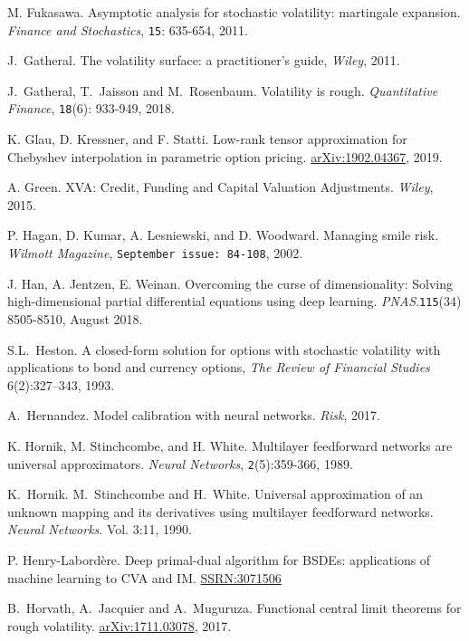 \documentclass{article}
\theoremstyle{remark}
\begin{document}
\begin{thebibliography}{99}
M. Fukasawa.
Asymptotic analysis for stochastic volatility: martingale expansion.
\textit{Finance and Stochastics}, {\tt 15}: 635-654, 2011.

 J.~Gatheral. The volatility surface: a practitioner's guide,
\textit{Wiley}, 2011.

J.~Gatheral, T.~Jaisson  and M.~Rosenbaum.
Volatility is rough.
\textit{Quantitative Finance}, {\tt 18}(6): 933-949, 2018.

K. Glau, D. Kressner, and F. Statti.
Low-rank tensor approximation for Chebyshev interpolation in parametric option pricing.
\href{https://arxiv.org/pdf/1902.04367.pdf}{arXiv:1902.04367}, 2019.

A. Green. XVA: Credit, Funding and Capital Valuation Adjustments. \textit{Wiley}, 2015.

P. Hagan, D. Kumar, A. Lesniewski, and D. Woodward. Managing smile risk. \textit{Wilmott Magazine}, {\tt September issue: 84-108}, 2002.

J. Han, A. Jentzen, E. Weinan.
Overcoming the curse of dimensionality: Solving high-dimensional partial differential equations using deep learning.
\textit{PNAS}.{\tt 115}(34) 8505-8510, August 2018.

S.L.~Heston. A closed-form solution for options with stochastic
  volatility with applications to bond and currency options, \textit{The Review of Financial Studies} 6(2):327--343, 1993.

A.~Hernandez. Model calibration with neural networks. \textit{Risk}, 2017.    

K. Hornik, M. Stinchcombe, and H. White. 
Multilayer feedforward networks are universal approximators. 
\textit{Neural Networks}, {\tt 2}(5):359-366, 1989.

K.~Hornik. M.~Stinchcombe and H.~White. Universal approximation of an unknown mapping and its derivatives using multilayer feedforward networks. \textit{Neural Networks}.
Vol. 3:11, 1990.

P. Henry-Labord\`{e}re.
Deep primal-dual algorithm for BSDEs: applications of machine learning to CVA and IM. 
\href{https://ssrn.com/abstract=3071506}{SSRN:3071506}

B.~Horvath, A.~Jacquier and A.~Muguruza.
Functional central limit theorems for rough volatility.
\href{https://arxiv.org/abs/1711.03078}{arXiv:1711.03078}, 2017.


\end{thebibliography}
\end{document}
